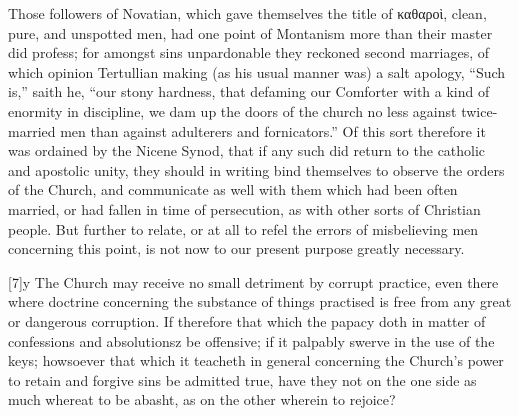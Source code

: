 Those followers of Novatian, which gave themselves the title of καθαροὶ, clean, pure, and unspotted men, had one point of Montanism more than their master did profess; for amongst sins unpardonable they reckoned second marriages, of which opinion Tertullian making (as his usual manner was) a salt apology, “Such is,” saith he, “our stony hardness, that defaming our Comforter with a kind of enormity in discipline, we dam up the doors of the church no less against twice-married men than against adulterers and fornicators.” Of this sort therefore it was ordained by the Nicene Synod, that if any such did return to the catholic and apostolic unity, they should in writing bind themselves to observe the orders of the Church, and communicate as well with them which had been often married, or had fallen in time of persecution, as with other sorts of Christian people. But further to relate, or at all to refel the errors of misbelieving men concerning this point, is not now to our present purpose greatly necessary.

[7]y The Church may receive no small detriment by corrupt practice, even there where doctrine concerning the substance of things practised is free from any great or dangerous  corruption. If therefore that which the papacy doth in matter of confessions and absolutionsz be offensive; if it palpably swerve in the use of the keys; howsoever that which it teacheth in general concerning the Church’s power to retain and forgive sins be admitted true, have they not on the one side as much whereat to be abasht, as on the other wherein to rejoice?

